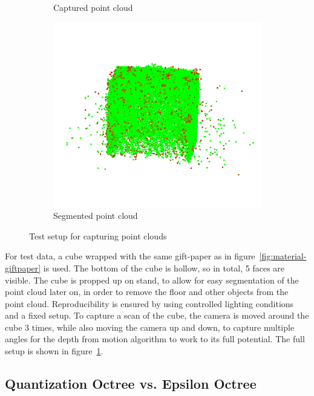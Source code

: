 \begin{figure}[h!tp]
\begin{subfigure}[b]{0.33\textwidth}
        \caption{Captured point cloud}
    \end{subfigure}%
    \begin{subfigure}[b]{0.33\textwidth}
        \centering
        \includegraphics[width=0.9\linewidth]{images/test-setup-segmented}
        \caption{Segmented point cloud}
    \end{subfigure}%
    \caption{Test setup for capturing point clouds}
    \label{fig:test-setup}
\end{figure}

For test data, a cube wrapped with the same gift-paper as in figure~\ref{fig:material-giftpaper} is used.
The bottom of the cube is hollow, so in total, 5 faces are visible.
The cube is propped up on stand, to allow for easy segmentation of the point cloud later on,
in order to remove the floor and other objects from the point cloud.
Reproducibility is ensured by using controlled lighting conditions and a fixed setup.
To capture a scan of the cube, the camera is moved around the cube 3 times, while also moving the camera up and down,
to capture multiple angles for the depth from motion algorithm to work to its full potential.
The full setup is shown in figure~\ref{fig:test-setup}.

\subsection{Quantization Octree vs. Epsilon Octree}\label{subsec:quantization-octree-vs.-epsilon-octree}


